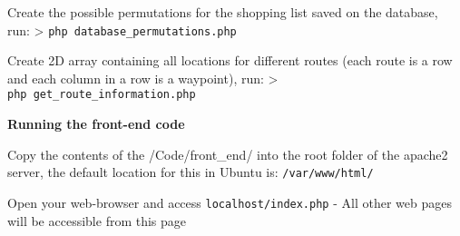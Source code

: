 \documentclass[10pt, a4paper, onecolumn]{scrartcl}
\begin{document}
	Create the possible permutations for the shopping list saved on the
	database, run: \textgreater{} \texttt{php\ database\_permutations.php}
	
	Create 2D array containing all locations for different routes (each
	route is a row and each column in a row is a waypoint), run:
	\textgreater{} \texttt{php\ get\_route\_information.php}
	
	\textbf{Running the front-end code}
	
	Copy the contents of the /Code/front\_end/ into the root folder of the
	apache2 server, the default location for this in Ubuntu is:
	\texttt{/var/www/html/}
	
	Open your web-browser and access \texttt{localhost/index.php} - All
	other web pages will be accessible from this page
	
\end{document}
